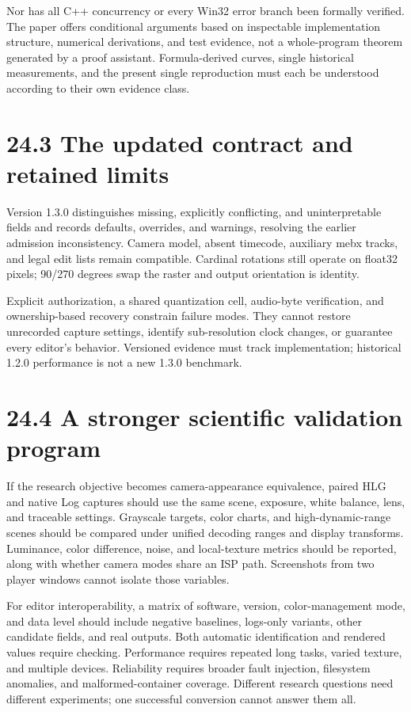 \documentclass[11pt,a4paper,openany]{book}
\begin{document}
Nor has all C++ concurrency or every Win32 error branch been formally verified. The paper offers conditional arguments based on inspectable implementation structure, numerical derivations, and test evidence, not a whole-program theorem generated by a proof assistant. Formula-derived curves, single historical measurements, and the present single reproduction must each be understood according to their own evidence class.


\section*{24.3 The updated contract and retained limits}
Version 1.3.0 distinguishes missing, explicitly conflicting, and uninterpretable fields and records defaults, overrides, and warnings, resolving the earlier admission inconsistency. Camera model, absent timecode, auxiliary mebx tracks, and legal edit lists remain compatible. Cardinal rotations still operate on float32 pixels; 90/270 degrees swap the raster and output orientation is identity.

Explicit authorization, a shared quantization cell, audio-byte verification, and ownership-based recovery constrain failure modes. They cannot restore unrecorded capture settings, identify sub-resolution clock changes, or guarantee every editor's behavior. Versioned evidence must track implementation; historical 1.2.0 performance is not a new 1.3.0 benchmark.


\section*{24.4 A stronger scientific validation program}
If the research objective becomes camera-appearance equivalence, paired HLG and native Log captures should use the same scene, exposure, white balance, lens, and traceable settings. Grayscale targets, color charts, and high-dynamic-range scenes should be compared under unified decoding ranges and display transforms. Luminance, color difference, noise, and local-texture metrics should be reported, along with whether camera modes share an ISP path. Screenshots from two player windows cannot isolate those variables.

For editor interoperability, a matrix of software, version, color-management mode, and data level should include negative baselines, logs-only variants, other candidate fields, and real outputs. Both automatic identification and rendered values require checking. Performance requires repeated long tasks, varied texture, and multiple devices. Reliability requires broader fault injection, filesystem anomalies, and malformed-container coverage. Different research questions need different experiments; one successful conversion cannot answer them all.
\end{document}
